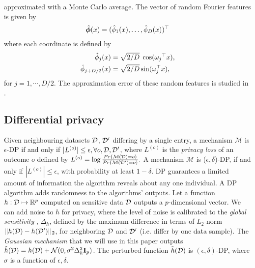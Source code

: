 \documentclass{article}
\newcommand{\mpsay}[1]{[\textbf{MP:} \textcolor{red!60!black}{#1}]}
\begin{document}
approximated with a Monte Carlo average. 
The vector of random Fourier features is given by 
\begin{align}\label{eq:RF}
    \hat{\mathbf{\bm{\phi}}}(x)=(\hat{\phi}_{1}(x),\ldots,\hat{\phi}_{D}(x))^{\top}
\end{align} where each coordinate is defined by 
%
\begin{align}
    \hat\phi_{j}(x) & = \sqrt{2/D}\;\cos(\omega_j{^\top} x), \nonumber \\
       \hat{\phi}_{j+D/2}(x)& =\sqrt{2/D}\sin(\omega_{j}^{\top}x), \nonumber 
\end{align} for $j=1, \cdots, D/2$.
%
%
%
The approximation error of these random features is studied in  \cite{Dougal_UAI}. 


\subsection{Differential privacy}\label{subsec:DP}

Given neighbouring datasets $\mathcal{D}$, $\mathcal{D}'$ differing by a single entry, a mechanism $\mathcal{M}$ is  $\epsilon$-DP if and only if
$|L^{(o)}| \leq \epsilon, \forall o, \mathcal{D}, \mathcal{D}'$, where $L^{(o)}$ is the \emph{privacy loss} of an outcome $o$ defined by
$
L^{(o)} = \log \frac{Pr(\mathcal{M}(\mathcal{D}) = o)}{Pr(\mathcal{M}(\mathcal{D}') = o)}.
$
%
A mechanism $\mathcal{M}$ is ($\epsilon, \delta$)-DP, if and only if
$|L^{(o)}| \leq \epsilon$, with probability at least $1-\delta$.
DP guarantees a limited amount of information the algorithm reveals about any one individual.
%
%
A DP algorithm adds randomness to the algorithms' outputs. Let a function $h: \mathcal{D} \mapsto \mathbb{R}^p$ computed on sensitive data $\mathcal{D}$ outputs a $p$-dimensional vector. We can add noise to $h$ for privacy, where the level of noise is calibrated to the {\it{global sensitivity}}
\citep{dwork2006our}, $\Delta_h$, defined by the maximum difference in terms of $L_2$-norm $||h(\mathcal{D})-h(\mathcal{D}') ||_2$, for neighboring $\mathcal{D}$ and $\mathcal{D}'$ (i.e. differ by one data sample). 
The \textit{Gaussian mechanism} that we will use in this paper outputs $\tilde{h}(\mathcal{D}) = h(\mathcal{D}) + \mathcal{N}(0, \sigma^2 \Delta_h^2\mathbf{I}_p)$. 
The perturbed function $\tilde{h}(\mathcal{D}) $ is $(\epsilon, \delta)$-DP, where $\sigma$ is a function of $\epsilon, \delta$. 
\end{document}
